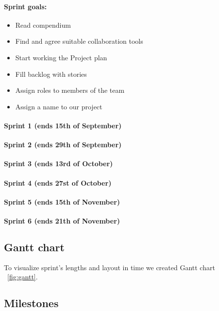 \documentclass{article}
\begin{document}
\paragraph{Sprint goals:}
\begin{itemize}
    \item Read compendium
    \item Find and agree suitable collaboration tools
    \item Start working the Project plan
    \item Fill backlog with stories
    \item Assign roles to members of the team
    \item Assign a name to our project
\end{itemize}



\paragraph{Sprint 1 (ends 15th of September)}
\paragraph{Sprint 2 (ends 29th of September)}
\paragraph{Sprint 3 (ends 13rd of October)}
\paragraph{Sprint 4 (ends 27st of October)}
\paragraph{Sprint 5 (ends 15th of November)}
\paragraph{Sprint 6 (ends 21th of November)}
\subsection{Gantt chart}
To visualize sprint's lengths and layout in time we created Gantt chart ~\ref{fig:gantt}.


\subsection{Milestones}
\end{document}
